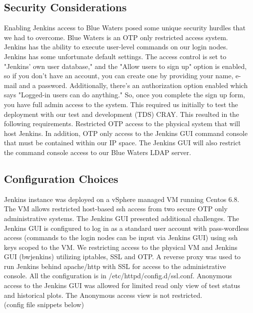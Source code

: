 \documentclass[10pt, conference, compsocconf]{IEEEtran}
\begin{document}
\subsection{Security Considerations}
Enabling Jenkins access to Blue Waters posed some unique security hurdles that we had to overcome. Blue Waters is an OTP only restricted access system. Jenkins has the ability to execute user-level commands on our login nodes. Jenkins has some unfortunate default settings. The access control is set to "Jenkins' own user database," and the "Allow users to sign up" option is enabled, so if you don't have an account, you can create one by providing your name, e-mail and a password. Additionally, there's an authorization option enabled which says "Logged-in users can do anything." So, once you complete the sign up form, you have full admin access to the system.  This required us initially to test the deployment with our test and development (TDS) CRAY. This resulted in the following requirements. Restricted OTP access to the physical system that will host Jenkins. In addition, OTP only access to the Jenkins GUI command console that must be contained within our IP space.  The Jenkins GUI will also restrict the command console access to our Blue Waters LDAP server. 

\subsection{Configuration Choices}
Jenkins instance was deployed on a vSphere managed VM running Centos 6.8. The VM allows restricted host-based ssh access from two secure OTP only administrative systems. The Jenkins GUI presented additional challenges. The Jenkins GUI is configured to log in as a standard user account with pass-wordless access (commands to the login nodes can be input via Jenkins GUI) using ssh keys scoped to the VM. We restricting access to the physical VM and Jenkins GUI (bwjenkins) utilizing iptables, SSL and OTP.  A reverse proxy was used to run Jenkins behind apache/http with SSL for access to the administrative console. All the configuration is in /etc/httpd/config.d/ssl.conf. Anonymous access to the Jenkins GUI was allowed for limited read only view of test status and historical plots. The Anonymous access view is not restricted. \\
(config file snippets below)
\end{document}
